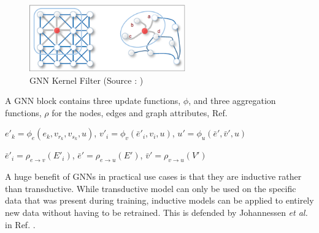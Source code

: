 \documentclass{report} %
\begin{document}
\begin{figure}[H]
    \centering
    \includegraphics[width=0.6\textwidth]{./ReportImages/GNNKernel.png} 
    \caption{\ac{GNN} Kernel Filter (Source : \cite{GNN-2019})}
    \label{fig:GNN Kernel Filter}
\end{figure}

A \ac{GNN} block contains three update functions, \( \phi \), and three aggregation functions, \( \rho \) for the nodes, edges and graph attributes, Ref. \cite{GNNs-2018}

$e'_k = \phi_e(e_k, v_{r_k}, v_{s_k}, u)$, $v'_i = \phi_v(\bar{e}'_i, v_i, u)$, $u' = \phi_u(\bar{e}', \bar{v}', u)$

$\bar{e}'_i = \rho_{e \to v}(E'_i)$, $\bar{e}' = \rho_{e \to u}(E')$, $\bar{v}' = \rho_{v \to u}(V')$

A huge benefit of \ac{GNN}s in practical use cases is that they are inductive rather 
than transductive. While transductive model can only be used on the specific data that was present during training, inductive models can be applied to entirely new 
data without having to be retrained. This is defended by Johannessen \textit{et al.} in Ref. \cite{ML HGNN-2023}.
\end{document}

